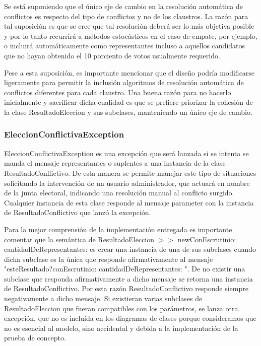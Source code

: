 Se está suponiendo que el único eje de cambio en la resolución automática de conflictos es respecto del tipo de conflictos y no de los claustros. La razón para tal suposición es que se cree que tal resolución deberá ser lo más objetiva posible y por lo tanto recurrirá a métodos estocásticos en el caso de empate, por ejemplo, o incluirá automáticamente como representantes incluso a aquellos candidatos que no hayan obtenido el 10 porciento de votos usualmente requerido.

Pese a esta suposición, es importante mencionar que el diseño podría modificarse ligeramente para permitir la inclusión algoritmos de resolución automática de conflictos diferentes para cada claustro. Una buena razón para no hacerlo inicialmente y sacrificar dicha cualidad es que se prefiere priorizar la cohesión de la clase ResultadoEleccion y sus subclases, manteniendo un único eje de cambio.


\subsubsection{EleccionConflictivaException}
EleccionConflictivaException es una excepción que será lanzada si se intenta se manda el mensaje representantes o suplentes a una instancia de la clase ResultadoConflictivo. De esta manera se permite manejar este tipo de situaciones solicitando la intervención de un usuario administrador, que actuará en nombre de la junta electoral, indicando una resolución manual al conflicto surgido. Cualquier instancia de esta clase responde al mensaje parameter con la instancia de ResultadoConflictivo que lanzó la excepción.



Para la mejor comprensión de la implementación entregada es importante comentar que la semántica de ResultadoEleccion $>>$ newConEscrutinio: cantidadDeRepresentantes:  es crear una instancia de una de sus subclases cuando dicha subclase es la única que responde afirmativamente al mensaje "esteResultado?conEscrutinio: cantidadDeRepresentantes: ". De no existir una subclase que responda afirmativamente a dicho mensaje se retorna una instancia de ResultadoConflictivo. Por esta razón ResultadoConflictivo responde siempre negativamente a dicho mensaje. Si existieran varias subclases de ResultadoEleccion que fueran compatibles con los parámetros, se lanza otra excepción, que no es incluída en los diagramas de clases porque consideramos que no es esencial al modelo, sino accidental y debida a la implementación de la prueba de concepto.



